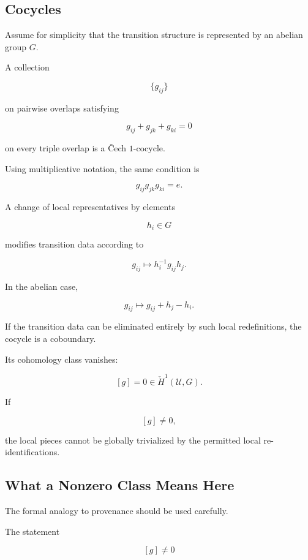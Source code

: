 \documentclass[
  11pt,
  a4paper,
  DIV=12,
  BCOR=0mm,
  parskip=half-
]{scrartcl}
\theoremstyle{definition}
\theoremstyle{plain}
\theoremstyle{remark}
\begin{document}
\subsection{Cocycles}
\label{app:cocycles}

Assume for simplicity that the transition structure is represented by an
abelian group \(G\).

A collection

\[
  \{
    g_{ij}
  \}
\]

on pairwise overlaps satisfying

\[
  g_{ij}+g_{jk}+g_{ki}=0
\]

on every triple overlap is a Čech \(1\)-cocycle.

Using multiplicative notation, the same condition is

\[
  g_{ij}g_{jk}g_{ki}=e.
\]

A change of local representatives by elements

\[
  h_i\in G
\]

modifies transition data according to

\[
  g_{ij}
  \mapsto
  h_i^{-1}g_{ij}h_j.
\]

In the abelian case,

\[
  g_{ij}
  \mapsto
  g_{ij}+h_j-h_i.
\]

If the transition data can be eliminated entirely by such local
redefinitions, the cocycle is a coboundary.

Its cohomology class vanishes:

\[
  [g]=0
  \in
  \check H^1(\mathcal U,G).
\]

If

\[
  [g]\neq 0,
\]

the local pieces cannot be globally trivialized by the permitted local
re-identifications.


\subsection{What a Nonzero Class Means Here}
\label{app:interpret-h1}

The formal analogy to provenance should be used carefully.

The statement

\[
  [g]\neq 0
\]
\end{document}
